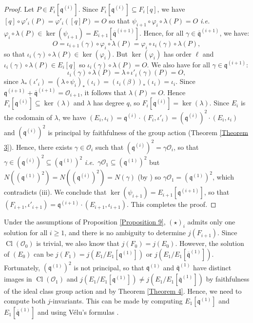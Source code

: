 \documentclass[a4paper,10pt]{report}
\theoremstyle{definition}
\theoremstyle{plain}
\theoremstyle{definition}
\newcommand{\ie}{\emph{i.e.}\ }
\newcommand{\mO}{\mathcal{O}}
\renewcommand{\(}{\left(}
\renewcommand{\)}{\right)}
\newcommand{\mf}[1]{\mathfrak{#1}}
\newcommand{\mfq}{\mathfrak{q}}
\DeclareMathOperator{\Cl}{Cl}
\begin{document}
\begin{proof}
Let $P\in F_i[\mfq^{(i)}]$. Since $F_i[\mfq^{(i)}]\subseteq F_i[q]$, we have $[q]\circ\varphi'_i(P)=\varphi'_i([q]P)=O$ so that $\psi_{i+1}\circ\varphi_i\circ\lambda(P)=O$ \ie  $\varphi_i\circ\lambda(P)\in\ker(\psi_{i+1})=E_{i+1}[\overline{\mfq}^{(i+1)}]$. Hence, for all $\gamma\in\overline{\mfq}^{(i+1)}$, we have:
\[O=\iota_{i+1}(\gamma)\circ\varphi_i\circ\lambda(P)=\varphi_i\circ\iota_i(\gamma)\circ\lambda(P),\]
so that $\iota_i(\gamma)\circ\lambda(P)\in \ker(\varphi_i)$. But $\ker(\varphi_i)$ has order $\ell$ and $\iota_i(\gamma)\circ\lambda(P)\in E_i[q]$ so $\iota_i(\gamma)\circ\lambda(P)=O$. We also have for all $\gamma\in\mfq^{(i+1)}$:
\[\iota_i(\gamma)\circ\lambda(P)=\lambda\circ\iota'_i(\gamma)(P)=O,\]
since $\lambda_*(\iota'_i)=(\lambda\circ\psi_i)_*(\iota_i)=(\iota_i(\beta))_*(\iota_i)=\iota_i$. Since $\mfq^{(i+1)}+\overline{\mfq}^{(i+1)}=\mO_{i+1}$, it follows that $\lambda(P)=O$. Hence $F_i[\mfq^{(i)}]\subseteq\ker(\lambda)$ and $\lambda$ has degree $q$, so $F_i[\mfq^{(i)}]=\ker(\lambda)$. Since $E_i$ is the codomain of $\lambda$, we have $(E_i,\iota_i)=\mfq^{(i)}\cdot (F_i,\iota'_i)=(\mfq^{(i)})^2\cdot (E_i,\iota_i)$ and $(\mfq^{(i)})^2$ is principal by faithfulness of the group action (Theorem \ref{Theorem 3}). Hence, there exists $\gamma\in\mO_i$ such that $(\mfq^{(i)})^2=\gamma\mO_i$, so that $\gamma\in (\mfq^{(i)})^2\subseteq (\mfq^{(1)})^2$ \ie $\gamma\mO_1\subseteq (\mfq^{(1)})^2$ but $N((\mfq^{(1)})^2)=N((\mfq^{(i)})^2)=N(\gamma)$ (by \cite[Proposition 7.20.(i)]{Cox}) so $\gamma\mO_1= (\mfq^{(1)})^2$, which contradicts (iii).  We conclude that $\ker(\psi_{i+1})=E_{i+1}[\mfq^{(i+1)}]$, so that $(F_{i+1},\iota'_{i+1})=\mf{q}^{(i+1)}\cdot(E_{i+1},\iota_{i+1})$. This completes the proof.
\end{proof}

Under the assumptions of Proposition \ref{Proposition 9},  $(\star)_i$ admits only one solution for all $i\geq 1$, and there is no ambiguity to determine $j(F_{i+1})$. Since $\Cl(\mO_0)$ is trivial, we also know that $j(F_0)=j(E_0)$. However, the solution of $(E_0)$ can be $j(F_1)=j(E_1/E_1[\mfq^{(1)}])$ or $j(E_1/E_1[\overline{\mfq}^{(1)}])$. Fortunately, $(\mfq^{(1)})^2$ is not principal, so that $\mfq^{(1)}$ and $\overline{\mfq}^{(1)}$ have distinct images in $\Cl(\mO_1)$ and $j(E_1/E_1[\mfq^{(1)}])\neq j(E_1/E_1[\overline{\mfq}^{(1)}])$ by faithfulness of the ideal class group action and by Theorem \ref{Theorem 4}.  Hence, we need to compute both $j$-invariants. This can be made by computing $E_1[\mfq^{(1)}]$ and $E_1[\overline{\mfq}^{(1)}]$ and using V\'{e}lu's formulas \cite{Velu}. 
\end{document}
